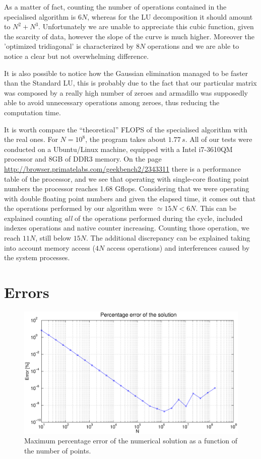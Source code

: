 \documentclass {article}
\begin{document}
As a matter of fact, counting the number of operations contained in the specialised algorithm is $6N$, whereas for the LU decomposition it should amount to $N^2+N^3$. Unfortunately we are unable to appreciate this cubic function, given the scarcity of data, however the slope of the curve is much higher.
Moreover the 'optimized tridiagonal' is characterized by $8N$ operations and we are able to notice a clear but not overwhelming difference. 

It is also possible to notice how the Gaussian elimination managed to be faster than the Standard LU, this is probably due to the fact that our particular matrix was composed by a really high number of zeroes and armadillo was supposedly able to avoid unnecessary operations among zeroes, thus reducing the computation time.

It is worth compare the ``theoretical'' FLOPS of the specialised algorithm with the real ones. For $N=10^{8}$, the program takes about $1.77\,s$. All of our tests were conducted on a Ubuntu/Linux machine, equipped with a Intel i7-3610QM processor and 8GB of DDR3 memory. On the page \url{http://browser.primatelabs.com/geekbench2/2343311} there is a performance table of the processor, and we see that operating with single-core floating point numbers the processor reaches 1.68 Gflops. Considering that we were operating with double floating point numbers and given the elapsed time, it comes out that the operations performed by our algorithm were $\simeq 15N < 6N$. This can be explained counting \emph{all} of the operations performed during the cycle, included indexes operations and native counter increasing. Counting those operation, we reach $11N$, still below $15N$. The additional discrepancy can be explained taking into account memory access ($4N$ access operations) and interferences caused by the system processes.

\section{Errors}
\begin{figure}[H]
	\centering
	\includegraphics[width=\textwidth]{errors}
	\caption{Maximum percentage error of the numerical solution as a function of the number of points.}
	\label{fig:errors}
\end{figure}
\end{document}
